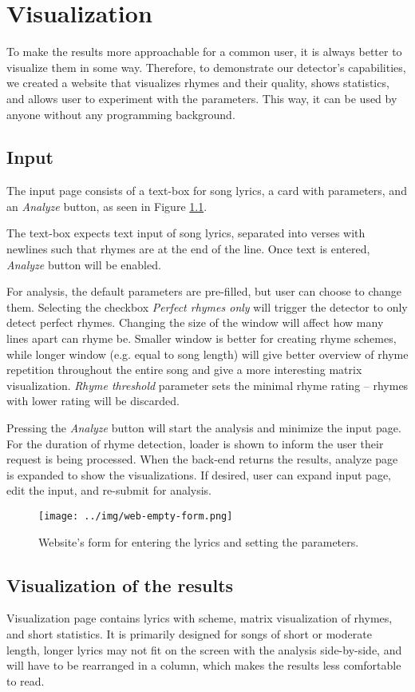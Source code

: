 \chapter{Visualization}\label{visualization}
To make the results more approachable for a common user, it is always better to visualize them in some way. Therefore, to demonstrate our detector's capabilities, we created a website that visualizes rhymes and their quality, shows statistics, and allows user to experiment with the parameters. This way, it can be used by anyone without any programming background.

\section{Input}
The input page consists of a text-box for song lyrics, a card with parameters, and an \textit{Analyze} button, as seen in Figure \ref{web-form}.

The text-box expects text input of song lyrics, separated into verses with newlines such that rhymes are at the end of the line. Once text is entered, \textit{Analyze} button will be enabled.

For analysis, the default parameters are pre-filled, but user can choose to change them. Selecting the checkbox \textit{Perfect rhymes only} will trigger the detector to only detect perfect rhymes. Changing the size of the window will affect how many lines apart can rhyme be. Smaller window is better for creating rhyme schemes, while longer window (e.g. equal to song length) will give better overview of rhyme repetition throughout the entire song and give a more interesting matrix visualization. \textit{Rhyme threshold} parameter sets the minimal rhyme rating -- rhymes with lower rating will be discarded.

Pressing the \textit{Analyze} button will start the analysis and minimize the input page. For the duration of rhyme detection, loader is shown to inform the user their request is being processed. When the back-end returns the results, analyze page is expanded to show the visualizations. If desired, user can expand input page, edit the input, and re-submit for analysis.

\begin{figure}[h]\centering
	\texttt{[image: ../img/web-empty-form.png]}
	\caption{Website's form for entering the lyrics and setting the parameters.}
	\label{web-form}
\end{figure}

\section{Visualization of the results}
Visualization page contains lyrics with scheme, matrix visualization of rhymes, and short statistics. It is primarily designed for songs of short or moderate length, longer lyrics may not fit on the screen with the analysis side-by-side, and will have to be rearranged in a column, which makes the results less comfortable to read.


